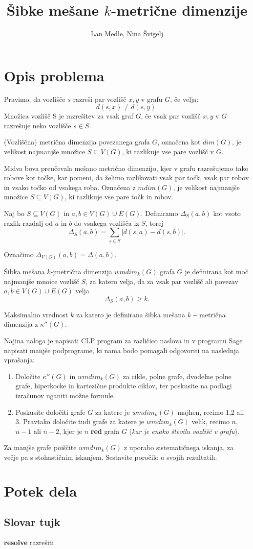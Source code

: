 \documentclass{article}
\author{Lan Medle, Nina Švigelj}
\title{Šibke mešane $k$-metrične dimenzije}
\theoremstyle{definition}
\begin{document}
\maketitle

\section{Opis problema}
Pravimo, da vozlišče $s$ razreši par vozlišč $x,y$ v grafu $G$, če velja: $$d(s,x) \neq d(s,y).$$
Množica vozlišč S je razrešitev za vsak graf $G$, če vsak par vozlišč $x,y$ v $G$ razrešuje neko vozlišče $s \in S.$

(Vozliščna) metrična dimenzija povezanega grafa $G$, označena kot $dim(G)$, je velikost najmanjše množice $S\subseteq V(G)$, ki razlikuje vse pare vozlišč v $G$.

Midva bova preučevala mešano metrično dimenzijo, kjer v grafu razrešujemo tako robove kot točke, kar pomeni, da želimo razlikovati vsak par točk, vsak par robov in vsako točko od vsakega roba. Označena z $mdim(G)$, je velikost najmanjše množice $S \subseteq V(G)$, ki razlikuje vse pare točk in robov.

Naj bo $S \subseteq V(G)$ in $a,b \in V(G) \cup E(G)$. Definiramo $\Delta_S (a,b)$ kot vsoto razlik razdalj od $a$ in $b$ do vsakega vozlišča iz $S$, torej $$\Delta_S(a,b) = \sum_{s\in S} |d(s,a) - d(s,b)|.$$

Označimo $\Delta_{V(G)} (a,b) = \Delta(a,b)$.

Šibka mešana $k$-jmetrična dimenzija $wmdim_k(G)$ grafa $G$ je definirana kot moč najmanjše mnoice vozlišč $S$, za katero velja, da za vsak par vozlišč ali povezav $a,b \in V(G) \cup E(G)$ velja $$\Delta_S(a,b) \ge k.$$

Maksimalno vrednost $k$ za katero je definirana šibka mešana $k-$metrična dimenzija z $\kappa''(G).$


\vspace{0.5cm}
\noindent
Najina naloga je napisati CLP program za različico naslova in v programu Sage napisati manjše podprograme, ki nama bodo pomagali odgovoriti na naslednja vprašanja:
\begin{enumerate}
    \item Določite $\kappa''(G)$ in $wmdim_k(G)$ za cikle, polne grafe, dvodelne polne grafe, hiperkocke in kartezične produkte ciklov, ter poskusite na podlagi izračunov uganiti možne formule.
    \item Poskusite določiti grafe $G$ za katere je $wmdim_k(G)$ majhen, recimo 1,2 ali 3. Pravtako določite tudi grafe za katere je $wmdim_k(G)$ velik, recimo $n$, $n-1$ ali $n-2$, kjer je $n$ \textbf{red} grafa $G$ (\textit{kar je enako številu vozlišč v grafu}).
\end{enumerate}
Za manjše grafe poiščite $wmdim_k(G)$ z uporabo sistematičnega iskanja, za večje pa s stohastičnim iskanjem. Sestavite poročilo o svojih rezultatih.


\section{Potek dela}

\subsection*{Slovar tujk}
\textbf{resolve} razrešiti
\end{document}
